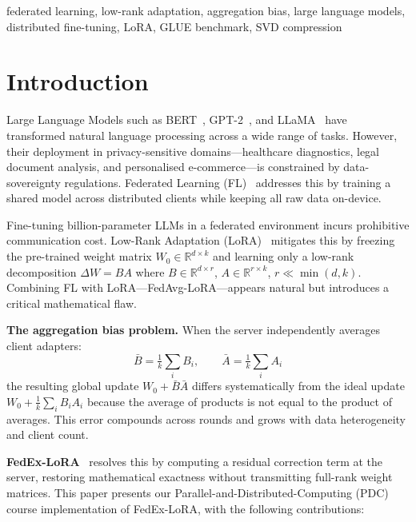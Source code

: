 \documentclass[conference]{IEEEtran}
\begin{document}
\begin{IEEEkeywords}
federated learning, low-rank adaptation, aggregation bias, large language
models, distributed fine-tuning, LoRA, GLUE benchmark, SVD compression
\end{IEEEkeywords}

\section{Introduction}

Large Language Models such as BERT~\cite{b_devlin}, GPT-2~\cite{b_radford},
and LLaMA~\cite{b_touvron} have transformed natural language processing across
a wide range of tasks. However, their deployment in privacy-sensitive
domains---healthcare diagnostics, legal document analysis, and personalised
e-commerce---is constrained by data-sovereignty regulations. Federated
Learning (FL)~\cite{b_mcmahan} addresses this by training a shared model
across distributed clients while keeping all raw data on-device.

Fine-tuning billion-parameter LLMs in a federated environment incurs
prohibitive communication cost. Low-Rank Adaptation
(LoRA)~\cite{b_hu} mitigates this by freezing the pre-trained weight matrix
$W_0\in\mathbb{R}^{d\times k}$ and learning only a low-rank decomposition
$\Delta W = BA$ where $B\in\mathbb{R}^{d\times r}$, $A\in\mathbb{R}^{r\times k}$,
$r\ll\min(d,k)$. Combining FL with LoRA---FedAvg-LoRA---appears natural but
introduces a critical mathematical flaw.

\textbf{The aggregation bias problem.}
When the server independently averages client adapters:
\[
  \bar{B} = \tfrac{1}{k}\sum_i B_i,\qquad
  \bar{A} = \tfrac{1}{k}\sum_i A_i
\]
the resulting global update $W_0 + \bar{B}\bar{A}$ differs systematically from
the ideal update $W_0 + \frac{1}{k}\sum_i B_i A_i$ because the average of
products is not equal to the product of averages. This error compounds across
rounds and grows with data heterogeneity and client count.

\textbf{FedEx-LoRA}~\cite{b_singhal} resolves this by computing a residual
correction term at the server, restoring mathematical exactness without
transmitting full-rank weight matrices. This paper presents our
Parallel-and-Distributed-Computing (PDC) course implementation of FedEx-LoRA,
with the following contributions:
\end{document}
